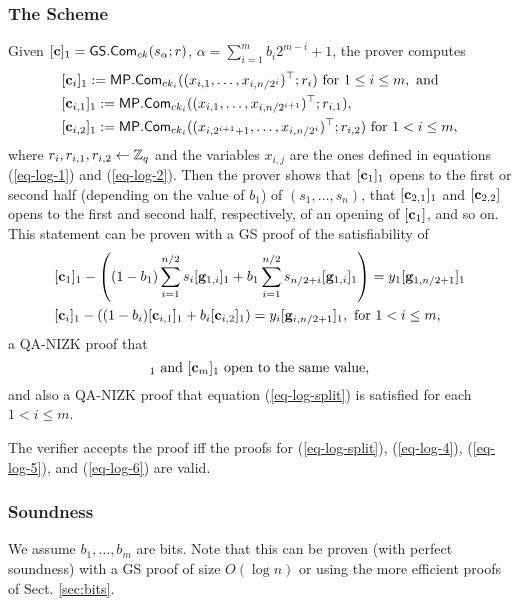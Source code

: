 \subsubsection{The Scheme}
Given $[\mathbf{c}]_1={\mathsf{GS}}.\mathsf{Com}_{ck}(s_\alpha;r)$, $\alpha=\sum_{i=1}^{m}b_i2^{m-i}+1$, the prover computes
\begin{align*}
&[\mathbf{c}_i]_1:=\mathsf{MP}.\mathsf{Com}_{ck_i}((x_{i,1},\ldots,x_{i,n/2^i})^\top;r_i) \text{ for } 1\leq i \leq m, \text{ and}\\
&[\mathbf{c}_{i,1}]_1:=\mathsf{MP}.\mathsf{Com}_{ck_i}((x_{i,1},\ldots,x_{i,n/2^{i+1}})^\top;r_{i,1}),\\
&[\mathbf{c}_{i,2}]_1:=\mathsf{MP}.\mathsf{Com}_{ck_i}((x_{i,2^{i+1}+1},\ldots, x_{i,n/2^i})^\top;r_{i,2})\text{ for }1 < i \leq m,
\end{align*}
where $r_i,r_{i,1},r_{i,2}\gets\mathbb{Z}_q$ and the variables $x_{i,j}$ are the ones defined in equations (\ref{eq-log-1}) and (\ref{eq-log-2}). Then the prover shows that
$[\mathbf{c}_1]_1$ opens to the first or second half (depending on the value of $b_1$) of $(s_1,\ldots,s_n)$, that $[\mathbf{c}_{2,1}]_1$ and $[\mathbf{c}_{2,2}]$ opens to the first and second half, respectively, of an opening of $[\mathbf{c}_{1}]$, and so on. This statement can be proven with a GS proof of
 the satisfiability of
\begin{align}
&[\mathbf{c}_1]_1-\left((1-b_1)\sum_{i=1}^{n/2}s_i[\mathbf{g}_{1,i}]_1 + b_1\sum_{i=1}^{n/2} s_{n/2+i}[\mathbf{g}_{1,i}]_1\right) = y_1[\mathbf{g}_{1,n/2+1}]_1 \label{eq-log-4}\\
&[\mathbf{c}_i]_1-\left((1-b_i)[\mathbf{c}_{i,1}]_1+b_i[\mathbf{c}_{i,2}]_1\right) = y_i[\mathbf{g}_{i,n/2+1}]_1, \text{ for } 1 < i \leq m,  \label{eq-log-5}
\end{align}
a QA-NIZK proof that
\begin{equation}
[\vecb{c}]_1\text{ and }[\vecb{c}_m]_1\text{ open to the same value}, \label{eq-log-6}
\end{equation}
and also a QA-NIZK proof that equation (\ref{eq-log-split}) is satisfied for each $1<i\leq m$.

The verifier accepts the proof iff the proofs for (\ref{eq-log-split}), (\ref{eq-log-4}), (\ref{eq-log-5}), and (\ref{eq-log-6}) are valid.

\subsubsection{Soundness}
We assume $b_1,\ldots,b_m$ are bits. Note that this can be proven (with perfect soundness) with a GS proof of size $O(\log n)$ or using the more efficient proofs of Sect. \ref{sec:bits}.

